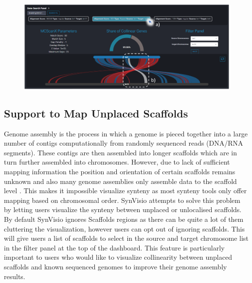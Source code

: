 \begin{figure}
  \centering
  \includegraphics[width=1\linewidth]{images/ch_5_gene_serach.PNG}
  \label{fig:ch_5_gene_serach}
\end{figure}


\subsection{Support to Map Unplaced Scaffolds}
Genome assembly is the process in which a genome is pieced together into a large number of contigs computationally from randomly sequenced reads (DNA/RNA segments)\cite{hunt2014comprehensive}. These contigs are then assembled into longer scaffolds which are in turn further assembled into chromosomes. However, due to lack of sufficient mapping information the position and orientation of certain scaffolds remains unknown and also many genome assemblies only assemble data to the scaffold level \cite{ensembl}. This makes it impossible visualize synteny as most synteny tools only offer mapping based on chromosomal order. SynVisio attempts to solve this problem by letting users visualize the synteny between unplaced or unlocalised scaffolds. By default SynVisio ignores Scaffolds regions as there can be quite a lot of them cluttering the visualization, however users can opt out of ignoring scaffolds. This will give users a list of scaffolds to select in the source and target chromosome list in the filter panel at the top of the dashboard. This feature is particularly important to users who would like to visualize collinearity between unplaced scaffolds and known sequenced genomes to improve their genome assembly results. 


